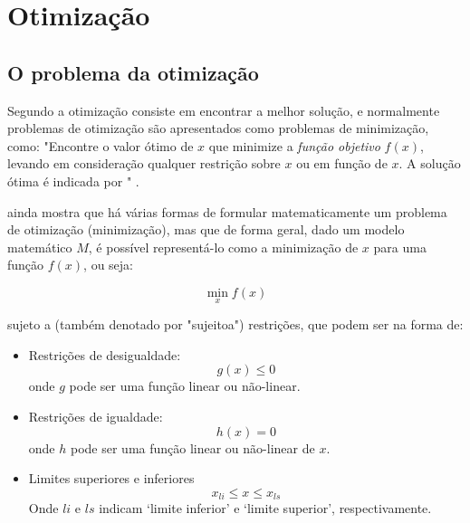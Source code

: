 \chapter{Otimização}
\label{otimizacao}

\section{O problema da otimização}

Segundo  a otimização consiste em encontrar a melhor solução, e normalmente problemas de otimização são apresentados como problemas de minimização, como: "Encontre o valor ótimo de $x$ que minimize a \textit{função objetivo} $f(x)$, levando em consideração qualquer restrição sobre $x$ ou em função de $x$. A solução ótima é indicada por " \cite{Haugen2018}.

 ainda mostra que há várias formas de formular matematicamente um problema de otimização (minimização), mas que de forma geral, dado um modelo matemático $M$, é possível representá-lo como a minimização de $x$ para uma função $f(x)$, ou seja:

\begin{equation}
\min_{x} f(x)
\end{equation}

sujeto a (também denotado por "\acrshort{sujeitoa}") restrições, que podem ser na forma de:

\begin{itemize}
\item Restrições de desigualdade:
	\begin{equation}
	\label{min_restr_desigualdade}
	g(x) \leq 0
	\end{equation}
	onde $g$ pode ser uma função linear ou não-linear.
	
\item Restrições de igualdade:
	\begin{equation}
	\label{min_restr_igualdade}
	h(x) = 0
	\end{equation}
	onde $h$ pode ser uma função linear ou não-linear de $x$.
	
\item Limites superiores e inferiores
	\begin{equation}
	\label{min_limites}
	x_{li} \leq x \leq x_{ls}
	\end{equation}
	Onde $li$ e $ls$ indicam `limite inferior' e `limite superior', respectivamente.
\end{itemize}

